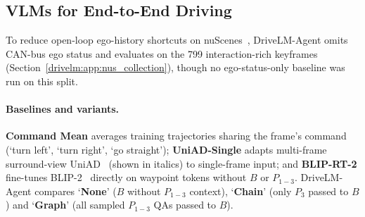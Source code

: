 \subsection{VLMs for End-to-End Driving}\label{drivelm:sec:exp_arch}

To reduce open-loop ego-history shortcuts on nuScenes~\cite{li2024ego}, DriveLM-Agent omits CAN-bus ego status and evaluates on the 799 interaction-rich keyframes (Section~\ref{drivelm:app:nus_collection}), though no ego-status-only baseline was run on this split.

\paragraph{Baselines and variants.}
\textbf{Command Mean} averages training trajectories sharing the frame's command (`turn left', `turn right', `go straight'); \textbf{UniAD-Single} adapts multi-frame surround-view UniAD~\cite{hu2023uniad} (shown in italics) to single-frame input; and \textbf{BLIP-RT-2} fine-tunes BLIP-2~\cite{li2023blip2} directly on waypoint tokens without $B$ or $P_{1-3}$. DriveLM-Agent compares `\textbf{None}' ($B$ without $P_{1-3}$ context), `\textbf{Chain}' (only $P_3$ passed to $B$) and `\textbf{Graph}' (all sampled $P_{1-3}$ QAs passed to $B$).

